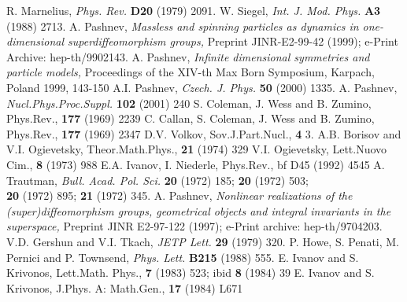 \documentclass[a4paper,twocolumn,showpacs,preprintnumbers,amsmath,amssymb]{revtex4}
\begin{document}
\begin{thebibliography}{1}
 R. Marnelius, {\em Phys. Rev.} {\bf D20} (1979) 2091.
 W. Siegel, {\em Int. J. Mod. Phys.} {\bf A3} (1988) 2713.
 A. Pashnev,
{\sl Massless and spinning particles as dynamics in one-dimensional
superdiffeomorphism groups,} Preprint JINR-E2-99-42 (1999);
e-Print Archive: hep-th/9902143.
 A. Pashnev,
{\sl Infinite dimensional symmetries and particle models,}
Proceedings of the XIV-th Max Born Symposium, Karpach, Poland
1999, 143-150
 A.I. Pashnev, {\em Czech. J. Phys.} {\bf 50} (2000) 1335.
 A. Pashnev, {\em Nucl.Phys.Proc.Suppl.}
 {\bf 102} (2001) 240
S. Coleman, J. Wess and B. Zumino, Phys.Rev., {\bf 177}
(1969) 2239
C. Callan, S. Coleman, J. Wess and B. Zumino, Phys.Rev., {\bf 177}
(1969) 2347
D.V. Volkov, Sov.J.Part.Nucl., {\bf 4} 3.
A.B. Borisov and V.I. Ogievetsky, Theor.Math.Phys., {\bf 21}
(1974) 329
V.I. Ogievetsky, Lett.Nuovo Cim., {\bf 8} (1973) 988
E.A. Ivanov, I. Niederle, Phys.Rev., {bf D45} (1992) 4545
A. Trautman, {\em Bull. Acad. Pol. Sci.} {\bf 20} (1972) 185;
{\bf 20} (1972) 503;\\ {\bf 20} (1972) 895; {\bf 21} (1972) 345.
A. Pashnev, {\sl
Nonlinear realizations of the (super)\-dif\-feo\-morphism groups,
geometrical objects and integral invariants in the superspace,}
Preprint JINR E2-97-122 (1997); e-Print archive: hep-th/9704203.
 V.D. Gershun and V.I. Tkach, {\em JETP Lett.}
            {\bf 29} (1979) 320.
P. Howe, S. Penati, M. Pernici and P. Townsend,
        {\em Phys. Lett.} {\bf B215} (1988) 555.
E. Ivanov and S. Krivonos, Lett.Math. Phys., {\bf 7} (1983) 523;
ibid {\bf 8} (1984) 39
E. Ivanov and S. Krivonos, J.Phys. A: Math.Gen., {\bf 17} (1984) L671
\end{thebibliography}
\end{document}
